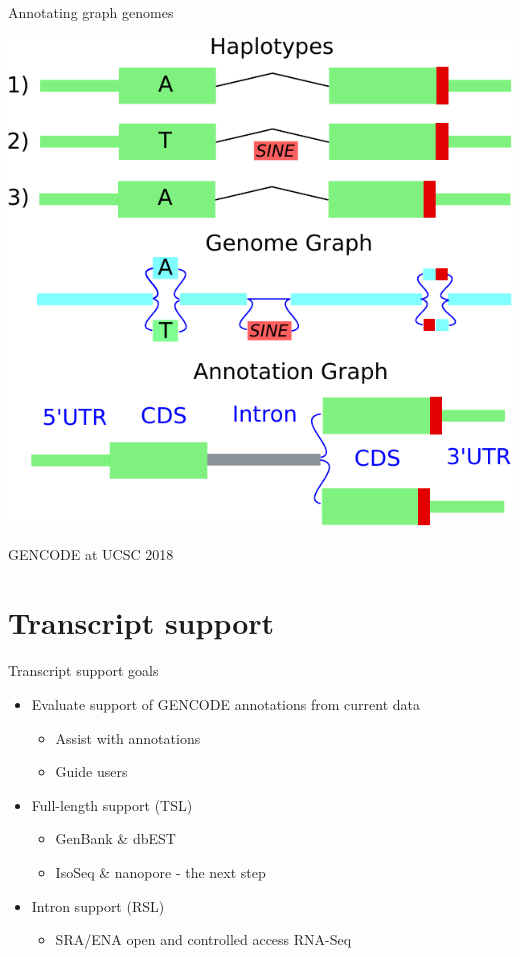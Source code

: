 \documentclass[10pt,
               hyperref={bookmarks=false,
                         bookmarksopen=false,
                         colorlinks=true,
                         linkcolor=blue,
                         urlcolor=blue},
               xcolor={svgnames,table}]{beamer}
\newcommand{\sectionframe}[1]{
  \begin{frame}{\thetitle}
    \section{#1}
  \end{frame}
}
\newenvironment{tightitemize}{%
\begin{itemize}
  \setlength{\itemsep}{1pt}%
  \setlength{\parskip}{0pt}%
  \setlength{\parsep}{0pt}%
}{\end{itemize}}
\newcommand{\thetitle}{GENCODE at UCSC 2018}
\begin{document}
\begin{frame}{Annotating graph genomes}
  \begin{center}
    \includegraphics[scale=0.65]{images/graph-annotation.pdf}
  \end{center}
\end{frame}

\sectionframe{Transcript support}
\begin{frame}{Transcript support goals}
  \begin{itemize}
  \item Evaluate support of GENCODE annotations from current data
    \begin{tightitemize}
    \item Assist with annotations
    \item Guide users
    \end{tightitemize}
  \item Full-length support (TSL)
    \begin{tightitemize}
    \item GenBank \& dbEST 
    \item IsoSeq \& nanopore - the next step
    \end{tightitemize}
  \item Intron support (RSL)
    \begin{tightitemize}
    \item SRA/ENA open and controlled access RNA-Seq
    \end{tightitemize}
  \end{itemize}
\end{frame}
\end{document}
